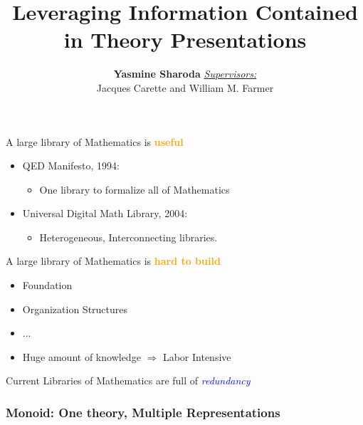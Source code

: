 \documentclass[t,10pt,numbers,fleqn,usenames,xcolor=dvipsnames]{beamer}
\title{Leveraging Information Contained in Theory Presentations}
\author{\textbf{Yasmine Sharoda} \newline 
\newline \underline{\textit{Supervisors:}} \vspace{0.5em}\\ 
Jacques Carette and William M. Farmer}
\date{}
\begin{document}
    
\frame{\titlepage}


\begin{frame}[fragile] 
\begin{center}
A large library of Mathematics is \textcolor{Orange}{\textbf{useful}} %
\end{center}
\vfill 
\begin{itemize}
\item QED Manifesto, 1994: 
\begin{itemize}
\item One library to formalize all of Mathematics 
\end{itemize}
\vspace{0.5cm}
\item Universal Digital Math Library, 2004: 
\begin{itemize}
\item Heterogeneous, Interconnecting libraries.  
\end{itemize}
\end{itemize}
\end{frame}

\begin{frame}[fragile] 
\begin{center}
A large library of Mathematics is \textcolor{Orange}{\textbf{hard to build}} 
\end{center}
\vfill 
\begin{itemize}
\item Foundation 
\item Organization Structures 
\item ... 
\item Huge amount of knowledge $\Rightarrow$ Labor Intensive 
\end{itemize}
\vfill 
\pause 
Current Libraries of Mathematics are full of \textcolor{blue}{\emph{redundancy}}
\end{frame}

\begin{frame}[fragile]
\frametitle{Monoid: One theory, Multiple Representations} 
\begin{figure}
  \scalebox{.95}{}
\end{figure}
\end{frame}
\end{document}
